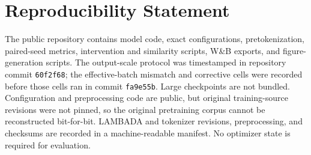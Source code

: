 \documentclass[10pt]{article}
\begin{document}
\section*{Reproducibility Statement}
The public repository contains model code, exact configurations, pretokenization, paired-seed metrics, intervention and similarity scripts, W\&B exports, and figure-generation scripts. The output-scale protocol was timestamped in repository commit \texttt{60f2f68}; the effective-batch mismatch and corrective cells were recorded before those cells ran in commit \texttt{fa9e55b}. Large checkpoints are not bundled. Configuration and preprocessing code are public, but original training-source revisions were not pinned, so the original pretraining corpus cannot be reconstructed bit-for-bit. LAMBADA and tokenizer revisions, preprocessing, and checksums are recorded in a machine-readable manifest. No optimizer state is required for evaluation.



\end{document}
